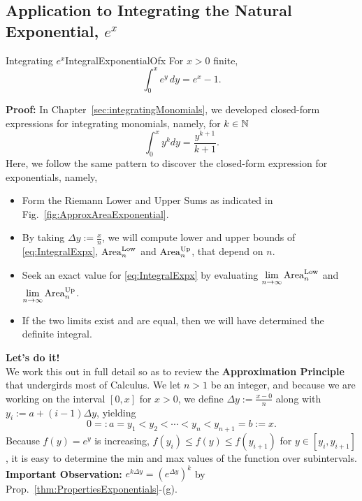 \subsection{Application to Integrating the Natural Exponential, \texorpdfstring{$e^x$}{ex}}

 \begin{propColor}{Integrating $e^x$}{IntegralExponentialOfx}
For $x>0$ finite, 
 \begin{equation}
 \label{eq:IntegralExpx}
     \int_0^x e^y \, dy = e^x -1.
 \end{equation}
\end{propColor}

\textbf{Proof:} In Chapter~\ref{sec:integratingMonomials}, we developed closed-form expressions for integrating monomials, namely, for $k\in \mathbb N$
$$ \int_0^x y^k dy = \frac{y^{k+1}}{k+1}.$$
 Here, we follow the same pattern to discover the closed-form expression for exponentials, namely,
 \begin{itemize}
     \item Form the Riemann Lower and Upper Sums as indicated in Fig.~\ref{fig:ApproxAreaExponential}.
     \item By taking $\Delta y := \frac{x}{n}$, we will compute lower and upper bounds of \eqref{eq:IntegralExpx}, ${\rm Area}^{\rm Low}_n$ and ${\rm Area}^{\rm Up}_n$, that depend on $n$.
     \item Seek an exact value for \eqref{eq:IntegralExpx} by evaluating $\displaystyle \lim_{n \to \infty} {\rm Area}^{\rm Low}_n$ and $\displaystyle \lim_{n \to \infty} {\rm Area}^{\rm Up}_n$.
     \item If the two limits exist and are equal, then we will have determined the definite integral. 
 \end{itemize}
 \textbf{Let's do it!} \\

We work this out in full detail so as to review the \textbf{Approximation Principle} that undergirds most of Calculus. We let $n>1$ be an integer, and because we are working on the interval $[0, x]$ for $x>0$, we define $\Delta y :=\frac{x-0}{n}$ along with 
$y_i:= a + (i-1) \Delta y$, yielding 
$$ 0 =: a=y_1 < y_2 < \cdots < y_n < y_{n+1} = b:= x.$$
Because $f(y) = e^y$ is increasing, $f(y_i) \le f(y) \le f(y_{i+1})$ for $y \in [y_i, y_{i+1}]$, it is easy to determine the min and max values of the function over subintervals.\\

\textbf{Important Observation:} $e^{k \Delta y} = \left( e^{\Delta y} \right)^k$ by Prop.~\ref{thm:PropertiesExponentials}-(g).\\

